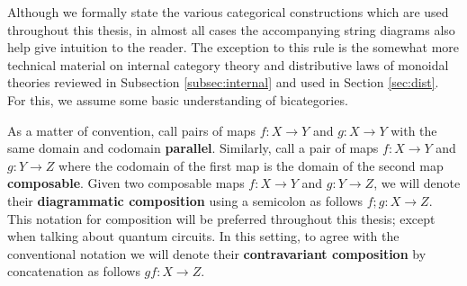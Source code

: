 \label{chap:cat}



Although we formally state the various categorical constructions which are used throughout this thesis, in almost all cases the accompanying string diagrams also help give intuition to the reader.  The exception to this rule is the somewhat more technical  material on internal category theory and distributive laws of monoidal theories reviewed in Subsection \ref{subsec:internal} and used in Section \ref{sec:dist}.  For this, we assume some basic understanding of bicategories.  %


As a matter of convention, call pairs of maps $f:X\to Y$ and $g:X\to Y$ with the same domain and codomain {\bf parallel}.   Similarly, call a pair of maps $f:X\to Y$ and $g:Y\to Z$ where the codomain of the first map is the domain of the second map {\bf composable}.
Given two composable maps $f:X\to Y$ and $g:Y \to Z$, we will denote their {\bf diagrammatic composition} using a semicolon as follows $f;g:X\to Z$. This notation for composition will be preferred throughout this thesis; except when talking about quantum circuits.  In this setting, to agree with the conventional notation we will denote their {\bf contravariant composition} by concatenation as follows $gf:X\to Z$.








